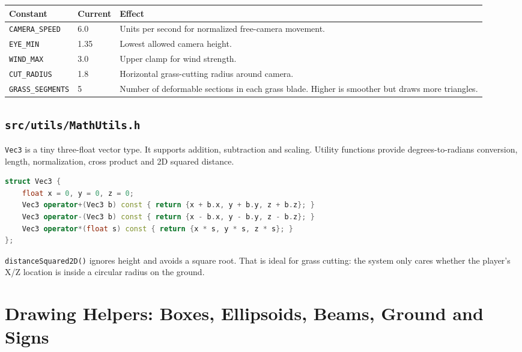 \documentclass[11pt,a4paper,openany]{book}
\newcommand{\code}[1]{\texttt{#1}}
\begin{document}
\begin{longtable}{@{}p{}p{}p{}@{}}
	\toprule
	Constant              & Current & Effect                                                                                          \\
	\midrule
	\endhead
	\code{CAMERA_SPEED}   & 6.0     & Units per second for normalized free-camera movement.                                           \\
	\code{EYE_MIN}        & 1.35    & Lowest allowed camera height.                                                                   \\
	\code{WIND_MAX}       & 3.0     & Upper clamp for wind strength.                                                                  \\
	\code{CUT_RADIUS}     & 1.8     & Horizontal grass-cutting radius around camera.                                                  \\
	\code{GRASS_SEGMENTS} & 5       & Number of deformable sections in each grass blade. Higher is smoother but draws more triangles. \\
	\bottomrule
\end{longtable}

\section{\texttt{src/utils/MathUtils.h}}
\code{Vec3} is a tiny three-float vector type. It supports addition, subtraction and scaling. Utility functions provide degrees-to-radians conversion, length, normalization, cross product and 2D squared distance.

\begin{lstlisting}[language=C++]
struct Vec3 {
    float x = 0, y = 0, z = 0;
    Vec3 operator+(Vec3 b) const { return {x + b.x, y + b.y, z + b.z}; }
    Vec3 operator-(Vec3 b) const { return {x - b.x, y - b.y, z - b.z}; }
    Vec3 operator*(float s) const { return {x * s, y * s, z * s}; }
};
\end{lstlisting}

\begin{beginnerbox}
	\code{distanceSquared2D()} ignores height and avoids a square root. That is ideal for grass cutting: the system only cares whether the player's X/Z location is inside a circular radius on the ground.
\end{beginnerbox}

\chapter{Drawing Helpers: Boxes, Ellipsoids, Beams, Ground and Signs}
\end{document}

